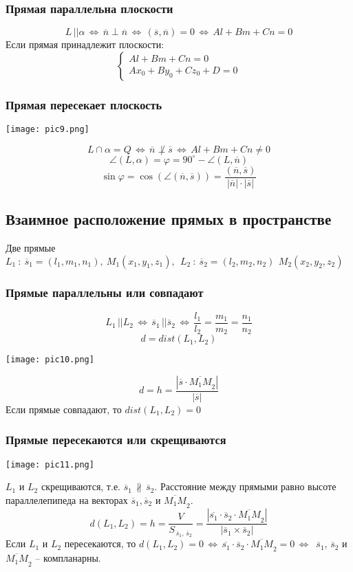 \documentclass{article}
\begin{document}
\subsubsection{Прямая параллельна плоскости}
$$ L\,||\alpha\,\Leftrightarrow\,\overline{n}\perp\overline{n}\,\Leftrightarrow\,(\overline{s},\overline{n})=0\,\Leftrightarrow\,Al+Bm+Cn=0$$
Если прямая принадлежит плоскости:
$$ \begin{cases}Al+Bm+Cn=0\\Ax_0+By_0+Cz_0+D=0\end{cases} $$
\subsubsection{Прямая пересекает плоскость}
\begin{center}
    \texttt{[image: pic9.png]}
\end{center}
$$ L\cap\alpha=Q\,\Leftrightarrow\,\overline{n}\not\perp\overline{s}\,\Leftrightarrow\,Al+Bm+Cn\neq0 $$
$$ \angle(L,\alpha)=\varphi=90^{\circ} -\angle(L,\overline{n})$$
$$ \sin\varphi=\cos(\angle(\overline{n},\overline{s}))=\frac{(\overline{n},\overline{s})}{|\overline{n}|\cdot|\overline{s}|} $$
\subsection{Взаимное расположение прямых в пространстве}
Две прямые $L_1\::\:\overline{s}_1=(l_1,m_1,n_1),\:M_1(x_1,y_1,z_1),\:\:L_2\::\:\overline{s}_2=(l_2,m_2,n_2)\,\:M_2(x_2,y_2,z_2)$
\subsubsection{Прямые параллельны или совпадают}
$$ L_1\,||L_2\,\Leftrightarrow\,\overline{s}_1\,||\overline{s}_2\,\Leftrightarrow\,\frac{l_1}{l_2}=\frac{m_1}{m_2}=\frac{n_1}{n_2} $$
$$ d=dist(L_1,L_2) $$
\begin{center}
    \texttt{[image: pic10.png]}
\end{center}
$$ d=h=\frac{|\overline{s}\cdot\overline{M_1M}_2|}{|\overline{s}|} $$
Если прямые совпадают, то $dist(L_1,L_2)=0$
\subsubsection{Прямые пересекаются или скрещиваются}
\begin{center}
    \texttt{[image: pic11.png]}
\end{center}
$L_1$ и $L_2$ скрещиваются, т.е. $\overline{s}_1\,\nparallel\,\overline{s}_2$. Расстояние между прямыми равно высоте параллелепипеда на векторах $\overline{s}_1,\overline{s}_2$ и $\overline{M_1M}_2$.
$$ d(L_1,L_2)=h=\frac{V}{S_{\,\overline{s}_1,\,\overline{s}_2}}=\frac{|\overline{s_1}\cdot\overline{s}_2\cdot\overline{M_1M}_2|}{|\overline{s}_1\times\overline{s}_2|} $$
Если $L_1$ и $L_2$ пересекаются, то $d(L_1,L_2)=0\,\Leftrightarrow\,\overline{s_1}\cdot\overline{s}_2\cdot\overline{M_1M}_2=0\,\Leftrightarrow\,$ $\overline{s}_1,\,\overline{s}_2$ и $\overline{M_1M}_2$ -- компланарны.
\newpage
\end{document}
